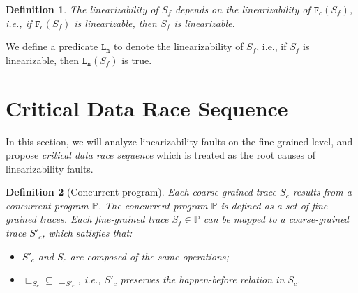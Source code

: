 \documentclass[runningheads]{llncs}
\newcommand{\p}{\mathbb{P} }
\newcommand{\ft}{S_f}
\newcommand{\ct}{S_c}
\newtheorem{myDef}{Definition}
\begin{document}
\begin{myDef}
The linearizability of $S_f$ depends on the linearizability of $\mathtt{F}_c(S_f)$, i.e., if $\mathtt{F}_c(S_f)$ is linearizable, then $S_f$ is linearizable. \end{myDef}

We define a predicate $\mathtt{L_n}$ to denote the linearizability of $S_f$, i.e., if $S_f$ is linearizable, then $\mathtt{L_n}(S_f)$ is true.


\section{Critical Data Race Sequence}\label{sec:criticaldataraces}



In this section, we will analyze linearizability faults on the fine-grained level, and propose \textit{critical data race sequence} which is treated as the root causes of linearizability faults.



\begin{myDef}[Concurrent program]\label{def:concurrentprogram}
Each coarse-grained trace $\ct$ results from a \textit{concurrent program} $\mathbb{P}$.
The concurrent program $\p$ 
 is defined as a set of fine-grained traces.
Each fine-grained trace $\ft \in \p$ can be mapped to a coarse-grained trace $S'_c$, which satisfies that: 
\begin{itemize}
  \item $S'_c$ and $S_c$ are composed of the same operations;
  \item $\sqsubset_{S_c}\subseteq \sqsubset_{S'_c}$, i.e., $S'_c$ preserves the \textit{happen-before} relation in $S_c$.
\end{itemize}
\end{myDef}
\end{document}
